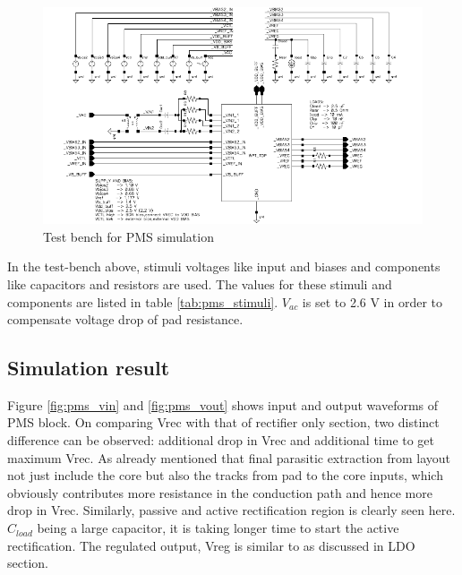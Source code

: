 \documentclass[12pt,a4paper,UKenglish]{report}
\begin{document}
\begin{figure} [H]
  \centering
  \includegraphics[width=1.05\textwidth]{img/pms_top_testbench.pdf} 
 \caption{Test bench for PMS simulation } 
\label{fig:wpt_top_testbench} 
\end{figure}

In the test-bench above, stimuli voltages like input and biases and components like capacitors and resistors are used. 
The values for these stimuli and components are listed in table \ref{tab:pms_stimuli}. $V_{ac} $ is set to 2.6 V in
order to compensate voltage drop of pad resistance.  \\ 


\subsection{Simulation result} %

Figure \ref{fig:pms_vin} and \ref{fig:pms_vout} shows input and output waveforms of PMS block. On comparing Vrec with 
that of rectifier only section, two distinct difference can be observed: additional drop in Vrec and additional time to 
get maximum Vrec. As already mentioned that final parasitic extraction from layout not just include the core but also 
the tracks from pad to the core inputs, which obviously contributes more resistance in the conduction path and hence 
more drop in Vrec. Similarly, passive and active rectification region is clearly seen here. $C_{load}$ being a large 
capacitor, it is taking longer time to start the active rectification. The regulated output, Vreg is similar to as discussed in LDO section. \\
\end{document}
